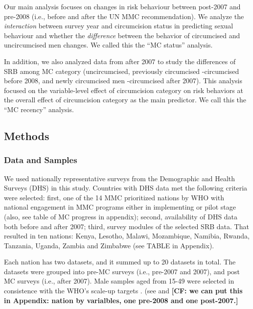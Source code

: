 \documentclass[12pt,]{article}
\begin{document}
Our main analysis focuses on changes in risk behaviour between post-2007
and pre-2008 (i.e., before and after the UN MMC recommendation). We
analyze the \emph{interaction} between survey year and circumcision
status in predicting sexual behaviour and whether the \emph{difference}
between the behavior of circumcised and uncircumcised men changes. We
called this the ``MC status'' analysis.

In addition, we also analyzed data from after 2007 to study the
differences of SRB among MC category (uncircumcised, previously
circumcised -circumcised before 2008, and newly circumcised men
-circumcised after 2007). This analysis focused on the variable-level
effect of circumcision category on risk behaviors at the overall effect
of circumcision category as the main predictor. We call this the ``MC
recency'' analysis.

\subsection{Methods}\label{methods}

\subsubsection{Data and Samples}\label{data-and-samples}

We used nationally representative surveys from the Demographic and
Health Surveys (DHS) in this study. Countries with DHS data met the
following criteria were selected: first, one of the 14 MMC prioritized
nations by WHO with national engagement in MMC programs either in
implementing or pilot stage \autocites{WHO11}{WHO11a}{WHO15} (also, see
table of MC progress in appendix); second, availability of DHS data both
before and after 2007; third, survey modules of the selected SRB data.
That resulted in ten nations: Kenya, Lesotho, Malawi, Mozambique,
Namibia, Rwanda, Tanzania, Uganda, Zambia and Zimbabwe (see TABLE in
Appendix).

Each nation has two datasets, and it summed up to 20 datasets in total.
The datasets were grouped into pre-MC surveys (i.e., pre-2007 and 2007),
and post MC surveys (i.e., after 2007). Male samples aged from 15-49
were selected in consistence with the WHO's scale-up targets
\autocite{WHO11a}. (see \autocite{tab:Status_characteristics} and
\autocites{tab:Recency_characteristics}[ Sample
Characteristics]{Recency} \textbf{{[}CF: we can put this in Appendix:
nation by varialbles, one pre-2008 and one post-2007.{]}}
\end{document}
